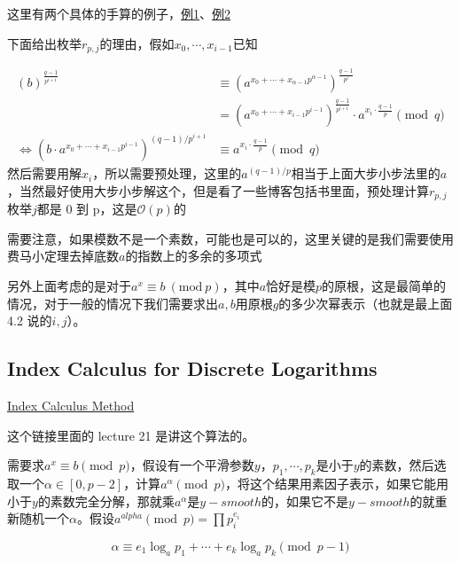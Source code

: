 \documentclass{article}
\begin{document}
这里有两个具体的手算的例子，\href{https://blog.csdn.net/oampamp1/article/details/104061969}{\color{blue}例1}、\href{https://risencrypto.github.io/PohligHellman/}{\color{blue}例2}

下面给出枚举$r_{p,j}$的理由，假如$x_0,\cdots,x_{i-1}$已知

\begin{equation}
    \begin{aligned}
        (b)^{\frac{q-1}{p^{i+1}}}                              & \equiv (a^{x_0+\cdots+x_{\alpha-1}p^{{\alpha-1}}})^{\frac{q-1}{p^i}}                            \\
                                                               & =(a^{x_0+\cdots+x_{i-1}p^{{i-1}}})^{\frac{q-1}{p^{i+1}}}\cdot a^{x_i\cdot\frac{q-1}{p}}\pmod{q} \\
        \Longleftrightarrow
        (b\cdot a^{x_0+\cdots+x_{i-1}p^{i-1}})^{(q-1)/p^{i+1}} & \equiv a^{x_i\cdot\frac{q-1}{p}}\pmod{q}
    \end{aligned}
\end{equation}
然后需要用解$x_i$，所以需要预处理，这里的$a^{(q-1)/p}$相当于上面大步小步法里的$a$，当然最好使用大步小步解这个，但是看了一些博客包括书里面，预处理计算$r_{p,j}$枚举$j$都是 0 到 p，这是$\mathcal{O}(p)$的

需要注意，如果模数不是一个素数，可能也是可以的，这里关键的是我们需要使用费马小定理去掉底数$a$的指数上的多余的多项式

另外上面考虑的是对于$a^x\equiv b~(\mathrm{mod}~p)$，其中$a$恰好是模$p$的原根，这是最简单的情况，对于一般的情况下我们需要求出$a,b$用原根$g$的多少次幂表示（也就是最上面 4.2 说的$i,j$）。

\subsection{Index Calculus for Discrete Logarithms}

\href{https://www.csa.iisc.ac.in/~chandan/courses/CNT/notes}{\color{blue} Index Calculus Method}

这个链接里面的 lecture 21 是讲这个算法的。

需要求$a^x\equiv b\pmod{p}$，假设有一个平滑参数$y$，$p_1,\cdots,p_k$是小于$y$的素数，然后选取一个$\alpha \in[0,p-2]$，计算$a^{\alpha}\pmod{p}$，将这个结果用素因子表示，如果它能用小于$y$的素数完全分解，那就乘$a^{\alpha}$是$y-smooth$的，如果它不是$y-smooth$的就重新随机一个$\alpha$。假设$a^{alpha}\pmod{p}=\prod p_i^{e_i}$

\begin{equation}
    \alpha \equiv e_1 \log_a{p_1} +\cdots+e_{k}\log_a{p_k}\pmod{p-1}
\end{equation}
\end{document}

